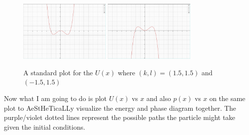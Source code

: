 \documentclass[12pt,letter]{article}
\begin{document}
{\begin{figure}[H]
	\centering
	\includegraphics[width=0.4\textwidth]{ss/dsms01.png}
	\includegraphics[width=0.4\textwidth]{ss/dsms4.png}
	\caption{A standard plot for the $U(x)$ where $(k,l) = (1.5,1.5)$ and $(-1.5,1.5)$}
	\label{fig:ss-dsms1-png}
\end{figure}
\newpage 
Now what I am going to do is plot $U(x)$ vs $x$ and also $p(x)$ vs $x$ on the same plot to AeStHeTicaLLy visualize the energy and phase diagram together. The purple/violet dotted lines represent the possible paths the particle might take given the initial conditions. 
}
\end{document}
